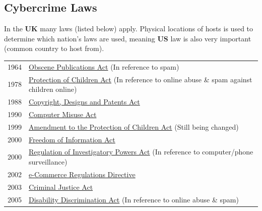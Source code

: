 \subsection{Cybercrime Laws}
In the \textbf{UK} many laws (listed below) apply. Physical locations of hosts is used to determine which nation's laws are used, meaning \textbf{US} law is also very important (common country to host from).
\begin{center}
    \begin{tabular}{l l}
        1964 & \href{https://www.legislation.gov.uk/ukpga/1964/74/contents}{Obscene Publications Act} (In reference to spam)                                           \\
        1978 & \href{https://www.legislation.gov.uk/ukpga/1978/37/contents}{Protection of Children Act} (In reference to online abuse \& spam against children online) \\
        1988 & \href{https://www.legislation.gov.uk/ukpga/1988/48/contents}{Copyright, Designs and Patents Act}                                                        \\
        1990 & \href{https://www.legislation.gov.uk/ukpga/1990/18/contents}{Computer Misuse Act}                                                                       \\
        1999 & \href{https://www.legislation.gov.uk/ukpga/1999/14/contents}{Amendment to the Protection of Children Act} (Still being changed)                         \\
        2000 & \href{https://www.legislation.gov.uk/ukpga/2000/36/contents}{Freedom of Information Act}                                                                \\
        2000 & \href{https://www.legislation.gov.uk/ukpga/2000/23/contents}{Regulation of Investigatory Powers Act} (In reference to computer/phone surveillance)      \\
        2002 & \href{https://www.legislation.gov.uk/uksi/2002/2013/made}{e-Commerce Regulations Directive}                                                             \\
        2003 & \href{https://www.legislation.gov.uk/ukpga/2003/44/contents}{Criminal Justice Act}                                                                      \\
        2005 & \href{https://www.legislation.gov.uk/ukpga/2005/13/contents}{Disability Discrimination Act} (In reference to online abuse \& spam)                      \\

\end{tabular}
\end{center}
